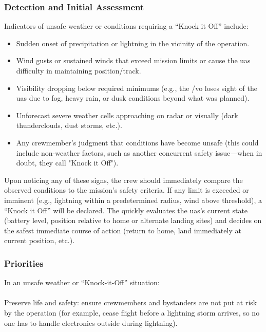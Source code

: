             \subsubsection{Detection and Initial Assessment} Indicators of unsafe weather or conditions requiring a “Knock it Off” include:
            \begin{itemize}
                \item Sudden onset of precipitation or lightning in the vicinity of the operation.
                \item Wind gusts or sustained winds that exceed mission limits or cause the \ac{uas} difficulty in maintaining position/track.
                \item Visibility dropping below required minimums (e.g., the /\ac{vo} loses sight of the \ac{uas} due to fog, heavy rain, or dusk conditions beyond what was planned).
                \item Unforecast severe weather cells approaching on radar or visually (dark thunderclouds, dust storms, etc.).
                \item Any crewmember's judgment that conditions have become unsafe (this could include non-weather factors, such as another concurrent safety issue—when in doubt, they call "Knock it Off").
            \end{itemize}
            Upon noticing any of these signs, the crew should immediately compare the observed conditions to the mission’s safety criteria. If any limit is exceeded or imminent (e.g., lightning within a predetermined radius, wind above threshold), a “Knock it Off” will be declared. The  quickly evaluates the \ac{uas}’s current state (battery level, position relative to home or alternate landing sites) and decides on the safest immediate course of action (return to home, land immediately at current position, etc.).
            
            \subsubsection{Priorities} In an unsafe weather or “Knock-it-Off” situation:
                \paragraph{}Preserve life and safety: ensure crewmembers and bystanders are not put at risk by the operation (for example, cease flight before a lightning storm arrives, so no one has to handle electronics outside during lightning).
